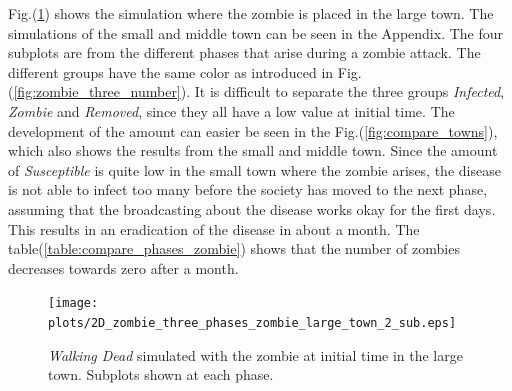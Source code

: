 \documentclass[%
twoside,                 %
final,                   %
10pt]{article}
\begin{document}
Fig.(\ref{fig:large_town}) shows the simulation where the zombie is placed in the large town. The simulations of the small and middle town can be seen in the Appendix. The four subplots are from the different phases that arise during a zombie attack. The different groups have the same color as introduced in Fig.(\ref{fig:zombie_three_number}). It is difficult to separate the three groups \emph{Infected}, \emph{Zombie} and \emph{Removed}, since they all have a low value at initial time. The development of the amount can easier be seen in the Fig.(\ref{fig:compare_towns}), which also shows the results from the small and middle town. Since the amount of \emph{Susceptible} is quite low in the small town where the zombie arises, the disease is not able to infect too many before the society has moved to the next phase, assuming that the broadcasting about the disease works okay for the first days. This results in an eradication of the disease in about a month. The table(\ref{table:compare_phases_zombie}) shows that the number of zombies decreases towards zero after a month. 


\begin{figure}[ht]
  \centerline{\texttt{[image: plots/2D\_zombie\_three\_phases\_zombie\_large\_town\_2\_sub.eps]}}
  \caption{
  \label{fig:large_town} \emph{Walking Dead} simulated with the zombie at initial time in the large town. Subplots shown at each phase.
  }
\end{figure}




\vspace{3mm}




\vspace{3mm}
\end{document}
